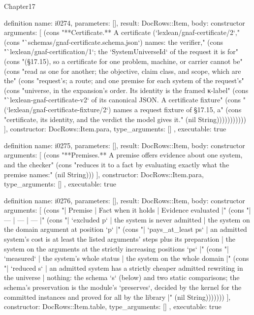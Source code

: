 \begin{lexlean}{Chapter17}
\begin{semanticmodule}
definition{
  name: i0274,
  parameters: [],
  result: DocRows::Item,
  body: constructor{
    arguments: [
      (cons "**Certificate.** A certificate (`lexlean/gnaf-certificate/2`," (cons "`schemas/gnaf-certificate.schema.json`) names: the verifier," (cons "`lexlean/gnaf-certification/1`; the `SystemUniverseId` of the request it is for" (cons "(§17.15), so a certificate for one problem, machine, or carrier cannot be" (cons "read as one for another; the objective, claim class, and scope, which are the" (cons "request's; a route; and one premise for each system of the request's" (cons "universe, in the expansion's order. Its identity is the framed κ-label" (cons "`lexlean-gnaf-certificate-v2` of its canonical JSON. A certificate fixture" (cons "(`lexlean/gnaf-certificate-fixture/2`) names a request fixture of §17.15, a" (cons "certificate, its identity, and the verdict the model gives it." (nil String)))))))))))
    ],
    constructor: DocRows::Item.para,
    type_arguments: []
  },
  executable: true
}

definition{
  name: i0275,
  parameters: [],
  result: DocRows::Item,
  body: constructor{
    arguments: [
      (cons "**Premises.** A premise offers evidence about one system, and the checker" (cons "reduces it to a fact by evaluating exactly what the premise names:" (nil String)))
    ],
    constructor: DocRows::Item.para,
    type_arguments: []
  },
  executable: true
}

definition{
  name: i0276,
  parameters: [],
  result: DocRows::Item,
  body: constructor{
    arguments: [
      (cons "| Premise | Fact when it holds | Evidence evaluated |" (cons "| --- | --- | --- |" (cons "| `excluded p` | the system is never admitted | the system on the domain argument at position `p` |" (cons "| `pays_at_least ps` | an admitted system's cost is at least the listed arguments' steps plus its preparation | the system on the arguments at the strictly increasing positions `ps` |" (cons "| `measured` | the system's whole status | the system on the whole domain |" (cons "| `reduced s` | an admitted system has a strictly cheaper admitted rewriting in the universe | nothing: the schema `s` (below) and two static comparisons; the schema's preservation is the module's `preserves`, decided by the kernel for the committed instances and proved for all by the library |" (nil String)))))))
    ],
    constructor: DocRows::Item.table,
    type_arguments: []
  },
  executable: true
}


\end{semanticmodule}
\end{lexlean}
